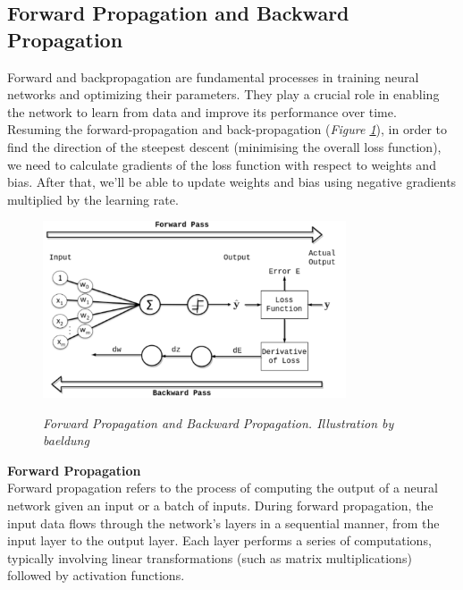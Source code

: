 \subsection{Forward Propagation and Backward Propagation}

Forward and backpropagation are fundamental processes in training neural networks and optimizing their parameters. They play a crucial role in enabling the network to learn from data and improve its performance over time. \\

Resuming the forward-propagation and back-propagation (\textit{Figure \ref{fig:forward-and-back-propagation}}), in order to find the direction of the steepest descent (minimising the overall loss function), we need to calculate gradients of the loss function with respect to weights and bias. After that, we’ll be able to update weights and bias using negative gradients multiplied by the learning rate.

\begin{figure}[H]
\centering
\includegraphics[width=0.8\textwidth]{imatges/preliminaries/front-and-back-prop.png}
    \caption[Forward Propagation and Backward Propagation]{\textit{Forward Propagation and Backward Propagation. Illustration by baeldung}}
{\label{fig:forward-and-back-propagation}}
\end{figure}

\vspace{0.5cm}
\textbf{Forward Propagation} \\

Forward propagation refers to the process of computing the output of a neural network given an input or a batch of inputs. During forward propagation, the input data flows through the network's layers in a sequential manner, from the input layer to the output layer. Each layer performs a series of computations, typically involving linear transformations (such as matrix multiplications) followed by activation functions. \\

